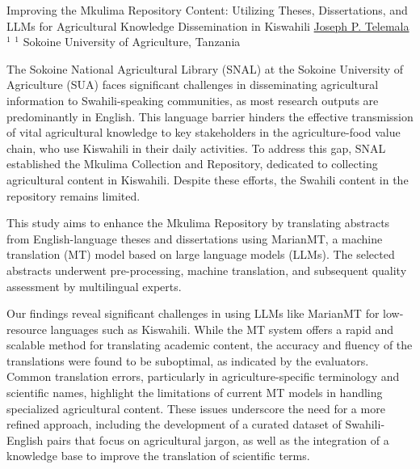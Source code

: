 

    \begin{abstract_online}{Improving the Mkulima Repository Content: Utilizing Theses, Dissertations, and LLMs for Agricultural Knowledge Dissemination in Kiswahili}{%
    \underline{Joseph P. Telemala}$^{1}$}{%
    }{%
    $^1$ Sokoine University of Agriculture, Tanzania
}

The Sokoine National Agricultural Library (SNAL) at the Sokoine University of Agriculture (SUA) faces significant challenges in disseminating agricultural information to Swahili-speaking communities, as most research outputs are predominantly in English. This language barrier hinders the effective transmission of vital agricultural knowledge to key stakeholders in the agriculture-food value chain, who use Kiswahili in their daily activities. To address this gap, SNAL established the Mkulima Collection and Repository, dedicated to collecting agricultural content in Kiswahili. Despite these efforts, the Swahili content in the repository remains limited.

This study aims to enhance the Mkulima Repository by translating abstracts from English-language theses and dissertations using MarianMT, a machine translation (MT) model based on large language models (LLMs). The selected abstracts underwent pre-processing, machine translation, and subsequent quality assessment by multilingual experts.

Our findings reveal significant challenges in using LLMs like MarianMT for low-resource languages such as Kiswahili. While the MT system offers a rapid and scalable method for translating academic content, the accuracy and fluency of the translations were found to be suboptimal, as indicated by the evaluators. Common translation errors, particularly in agriculture-specific terminology and scientific names, highlight the limitations of current MT models in handling specialized agricultural content. These issues underscore the need for a more refined approach, including the development of a curated dataset of Swahili-English pairs that focus on agricultural jargon, as well as the integration of a knowledge base to improve the translation of scientific terms.

\end{abstract_online}

